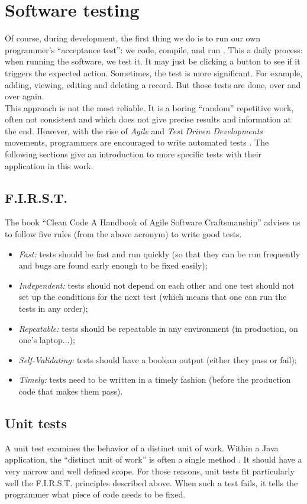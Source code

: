 \documentclass[a4paper, oneside, 11pt]{book}
\begin{document}
\section{Software testing}
Of course, during development, the first thing we do is to run our own programmer's “acceptance test”: we code, compile, and run \cite{junit:book}. This a daily process: when running the software, we test it. It may just be clicking a button to see if it triggers the expected action. Sometimes, the test is more significant. For example, adding, viewing, editing and deleting a record. But those tests are done, over and over again.\\

This approach is not the most reliable. It is a boring “random” repetitive work, often not consistent and which does not give precise results and information at the end. However, with the rise of \emph{Agile} and \emph{Test Driven Developments} movements, programmers are encouraged to write automated tests \cite{cleancode:book}. The following sections give an introduction to more specific tests with their application in this work.

\subsection{F.I.R.S.T.}
The book “Clean Code A Handbook of Agile Software Craftsmanship” \cite{cleancode:book} advises us to follow five rules (from  the above acronym) to write good tests.
\begin{itemize}
	\item \textit{Fast:} tests should be fast and run quickly (so that they can be run frequently and bugs are found early enough to be fixed easily);
	\item \textit{Independent:} tests should not depend on each other and one test should not set up the conditions for the next test (which means that one can run the tests in any order);
	\item \textit{Repeatable:} tests should be repeatable in any environment (in production, on one’s laptop...);
	\item \textit{Self-Validating:} tests should have a boolean output (either they pass or fail); 
	\item \textit{Timely:} tests need to be written in a timely fashion (before the production code that makes them pass).
\end{itemize}

\subsection{Unit tests}
A unit test examines the behavior of a distinct unit of work. Within a Java application, the “distinct unit of work” is often a single method \cite{junit:book}. It should have a very narrow and well defined scope. For those reasons, unit tests fit particularly well the F.I.R.S.T. principles described above. When such a test fails, it tells the programmer what piece of code needs to be fixed.\\
\end{document}
